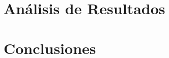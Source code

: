 \documentclass[conference]{IEEEtran}
\begin{document}
\section{Análisis de Resultados}


\section{Conclusiones}











\end{document}
